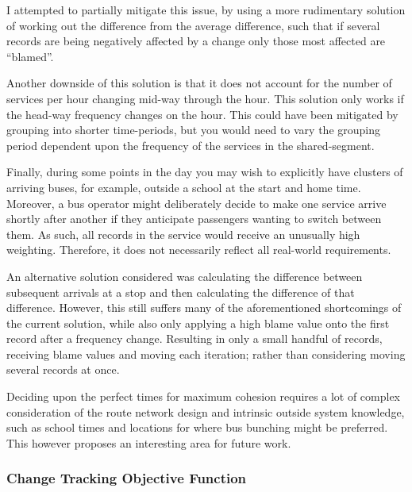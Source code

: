 \documentclass{article}
\begin{document}
\par 
I attempted to partially mitigate this issue, by using a more rudimentary solution of working out the difference from the average difference, such that if several records are being negatively affected by a change only those most affected are ``blamed''.


\par 
Another downside of this solution is that it does not account for the number of services per hour changing mid-way through the hour. This solution only works if the head-way frequency changes on the hour. This could have been mitigated by grouping into shorter time-periods, but you would need to vary the grouping period dependent upon the frequency of the services in the shared-segment. 

\par 
Finally, during some points in the day you may wish to explicitly have clusters of arriving buses, for example, outside a school at the start and home time. Moreover, a bus operator might deliberately decide to make one service arrive shortly after another if they anticipate passengers wanting to switch between them. As such, all records in the service would receive an unusually high weighting. Therefore, it does not necessarily reflect all real-world requirements. 


\par 
An alternative solution considered was calculating the difference between subsequent arrivals at a stop and then calculating the difference of that difference. However, this still suffers many of the aforementioned shortcomings of the current solution, while also only applying a high blame value onto the first record after a frequency change. Resulting in only a small handful of records, receiving blame values and moving each iteration; rather than considering moving several records at once.

\par 
Deciding upon the perfect times for maximum cohesion requires a lot of complex consideration of the route network design and intrinsic outside system knowledge, such as school times and locations for where bus bunching might be preferred. This however proposes an interesting area for future work.


\subsubsection{Change Tracking Objective Function}
\end{document}
